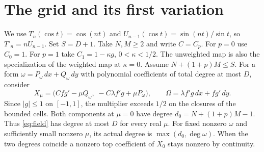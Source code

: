 \documentclass[11pt,a4paper]{amsart}
\numberwithin{equation}{section}
\begin{document}
\section{The grid and its first variation}\label{sec:grid}
We use $T_n(\cos t)=\cos(nt)$ and $U_{n-1}(\cos t)=\sin(nt)/\sin t$, so $T'_n=nU_{n-1}$. Set $S=D+1$. Take $N,M\ge2$ and write $C=C_p$. For $p=0$ use $C_0=1$. For $p=1$ take $C_1=1-\kappa g$, $0<\kappa<1/2$. The unweighted map is also the specialization of the weighted map at $\kappa=0$. Assume $N+(1+p)M\le S$. For a form $\omega=P_\omega\,dx+Q_\omega\,dy$ with polynomial coefficients of total degree at most $D$, consider
\begin{equation}\label{eq:field}
 X_\mu=\bigl(Cfg'-\mu Q_\omega,\;-C\lambda f'g+\mu P_\omega\bigr),\qquad
 \Omega=\lambda f'g\,dx+fg'\,dy .
\end{equation}
Since $|g|\le1$ on $[-1,1]$, the multiplier exceeds $1/2$ on the closures of the bounded cells. Both components at \(\mu=0\) have degree $d_0=N+(1+p)M-1$. Thus \eqref{eq:field} has degree at most $D$ for every real $\mu$. For fixed nonzero $\omega$ and sufficiently small nonzero $\mu$, its actual degree is $\max(d_0,\deg\omega)$. When the two degrees coincide a nonzero top coefficient of $X_0$ stays nonzero by continuity.
\end{document}
